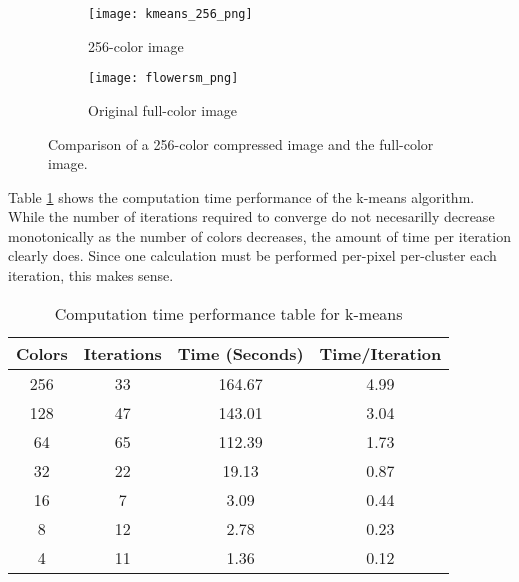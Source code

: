 \documentclass[letter,11pt,titlepage]{article}
\begin{document}
\begin{figure}[H]
    \centering
    \begin{subfigure}[b]{0.4\textwidth}
        \texttt{[image: kmeans\_256\_png]}
        \caption{256-color image}
    \end{subfigure}
    \begin{subfigure}[b]{0.4\textwidth}
        \texttt{[image: flowersm\_png]}
        \caption{Original full-color image}
    \end{subfigure}
    \caption{Comparison of a 256-color compressed image and the full-color image.}
    \label{fig:km-256}
\end{figure}

Table \ref{tab:km-comp} shows the computation time performance of the k-means algorithm. While the number of iterations required to converge do not necesarilly decrease monotonically as the number of colors decreases, the amount of time per iteration clearly does. Since one calculation must be performed per-pixel per-cluster each iteration, this makes sense.

\begin{table}[H]
    \centering
    \begin{tabular}{||c|c|c|c||}
        \hline
        \hline
        \textbf{Colors} &   \textbf{Iterations}     &   \textbf{Time (Seconds)} &   \textbf{Time/Iteration} \\
        \hline
        256             &   33                      &   164.67                  &   4.99                    \\
        \hline
        128             &   47                      &   143.01                  &   3.04                    \\
        \hline
        64              &   65                      &   112.39                  &   1.73                    \\
        \hline
        32              &   22                      &   19.13                   &   0.87                    \\
        \hline
        16              &   7                       &   3.09                    &   0.44                    \\
        \hline
        8               &   12                      &   2.78                    &   0.23                    \\
        \hline
        4               &   11                      &   1.36                    &   0.12                    \\
        \hline
        \hline
    \end{tabular}
    \caption{Computation time performance table for k-means}
    \label{tab:km-comp}
\end{table}
\end{document}
